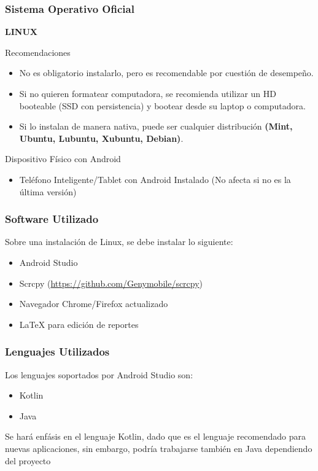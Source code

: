 \begin{frame}
\frametitle{Sistema Operativo Oficial}

\textbf{LINUX}
\begin{block}{Recomendaciones}
\begin{itemize}
\item No es obligatorio instalarlo, pero es recomendable por cuestión de desempeño.
\item Si no quieren formatear computadora, se recomienda utilizar un HD booteable (SSD con persistencia) y bootear desde su laptop o computadora.
\item Si lo instalan de manera nativa, puede ser cualquier distribución \textbf{(Mint, Ubuntu, Lubuntu, Xubuntu, Debian)}.
\end{itemize}
\end{block}
\begin{block}{Dispositivo Físico con Android}
\begin{itemize}
\item Teléfono Inteligente/Tablet con Android Instalado (No afecta si no es la última versión)
\end{itemize}
\end{block}
\end{frame}


\begin{frame}
\frametitle{Software Utilizado}
Sobre una instalación de Linux, se debe instalar lo siguiente:
\begin{itemize}
\item Android Studio
\item Scrcpy (\url{https://github.com/Genymobile/scrcpy})
\item Navegador Chrome/Firefox actualizado
\item LaTeX para edición de reportes
\end{itemize}
\end{frame}

\begin{frame}
\frametitle{Lenguajes Utilizados}
Los lenguajes soportados por Android Studio son:
\begin{itemize}
\item Kotlin
\item Java
\end{itemize}
Se hará enfásis en el lenguaje Kotlin, dado que es el lenguaje recomendado para nuevas aplicaciones, sin embargo, podría trabajarse también en Java dependiendo del proyecto
\end{frame}

